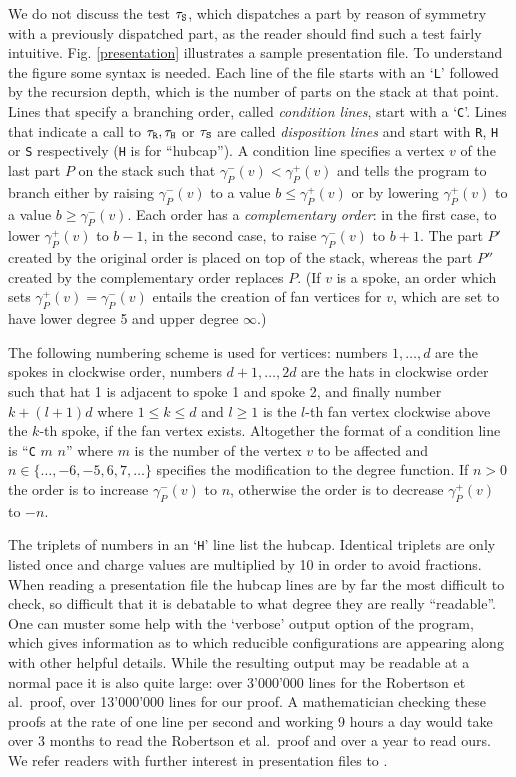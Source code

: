 \documentclass[11pt]{article}
\newcommand{\gm}{\gamma}
\begin{document}
We do not discuss the test $\tau_{\tt S}$, which dispatches a part by reason of symmetry with a previously dispatched part, as the reader should find such a test fairly intuitive. Fig$.$ \ref{presentation} illustrates a sample presentation file. To understand the figure some syntax is needed. Each line of the file starts with an `{\tt L}' followed by the recursion depth, which is the number of parts on the stack at that point. Lines that specify a branching order, called \emph{condition lines}, start with a `{\tt C}'. Lines that indicate a call to $\tau_{\tt R}, \tau_{\tt H}$ or $\tau_{\tt S}$ are called \emph{disposition lines} and start with {\tt R}, {\tt H} or {\tt S} respectively ({\tt H} is for ``hubcap'').
A condition line specifies a vertex $v$ of the last part $P$ on the stack such that $\gm_P^-(v) < \gm_P^+(v)$ and tells the program to branch either by raising $\gm_P^-(v)$ to a value $b \leq \gm_P^+(v)$ or by lowering $\gm_P^+(v)$ to a value $b \geq \gm_P^-(v)$. Each order has a \emph{complementary order}: in the first case, to lower $\gm_P^+(v)$ to $b - 1$, in the second case, to raise $\gm_P^-(v)$ to $b + 1$. The part $P'$ created by the original order is placed on top of the stack, whereas the part $P''$ created by the complementary order replaces $P$. (If $v$ is a spoke, an order which sets $\gm_P^+(v) = \gm_P^-(v)$ entails the creation of fan vertices for $v$, which are set to have lower degree 5 and upper degree $\infty$.) 

The following numbering scheme is used for vertices: numbers $1, \dots, d$ are the spokes in clockwise order, 
numbers $d + 1, \dots, 2d$ are the hats in clockwise order such that hat 1 is adjacent to spoke 1 and spoke 2, and finally number $k + (l+1)d$ where $1 \leq k \leq d$ and $l \geq 1$ is the $l$-th fan vertex clockwise above the $k$-th spoke, if the fan vertex exists. 
Altogether the format of a condition line is ``{\tt C} $m$ $n$'' where $m$ is the number of the vertex $v$ to be affected and $n \in \{\dots, -6, -5, 6, 7, \dots\}$ specifies the modification to the degree function. If $n > 0$ the order is to increase $\gm_P^-(v)$ to $n$, otherwise the order is to decrease $\gm_P^+(v)$ to $-n$.  

\presentationfig

The triplets of numbers in an `{\tt H}' line list the hubcap. Identical triplets are only listed once and charge values are multiplied by 10 in order to avoid fractions. 
When reading a presentation file the hubcap lines are by far the most difficult to check, so difficult that it is debatable to what degree they are really ``readable''. 
One can muster some help with the `verbose' output option of the program,
which gives information as to which reducible configurations are appearing along with other helpful details. While the resulting output may be readable at a normal pace it is also quite large: over 3'000'000 lines for the Robertson et al.~proof, over 13'000'000 lines for our proof. A mathematician checking these proofs at the rate of one line per second and working 9 hours a day would take over 3 months to read the Robertson et al.~proof and over a year to read ours. 
We refer readers with further interest in presentation files to \cite{discharge}.
\end{document}
